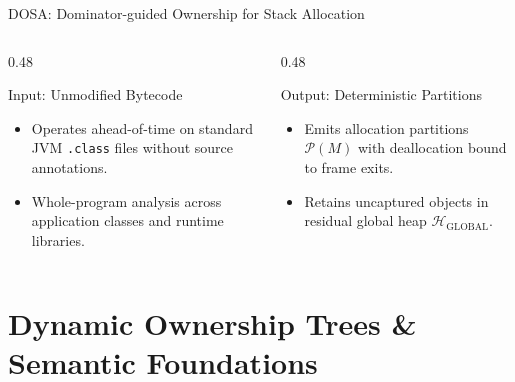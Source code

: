 \documentclass[11pt]{beamer}
\begin{document}
\begin{frame}{DOSA: Dominator-guided Ownership for Stack Allocation}
  \begin{columns}[T]
    \begin{column}{0.48\textwidth}
      \begin{block}{Input: Unmodified Bytecode}
        \scriptsize
        \begin{itemize}\setlength{\itemsep}{1pt}
          \item Operates ahead-of-time on standard JVM \texttt{.class} files without source annotations.
          \item Whole-program analysis across application classes and runtime libraries.
        \end{itemize}
      \end{block}
    \end{column}
    \begin{column}{0.48\textwidth}
      \begin{block}{Output: Deterministic Partitions}
        \scriptsize
        \begin{itemize}\setlength{\itemsep}{1pt}
          \item Emits allocation partitions $\mathcal{P}(M)$ with deallocation bound to frame exits.
          \item Retains uncaptured objects in residual global heap $\mathcal{H}_{\text{GLOBAL}}$.
        \end{itemize}
      \end{block}
    \end{column}
  \end{columns}
\end{frame}
\endgroup

\section[Dynamic Ownership Trees]{Dynamic Ownership Trees \& Semantic Foundations}
\end{document}
